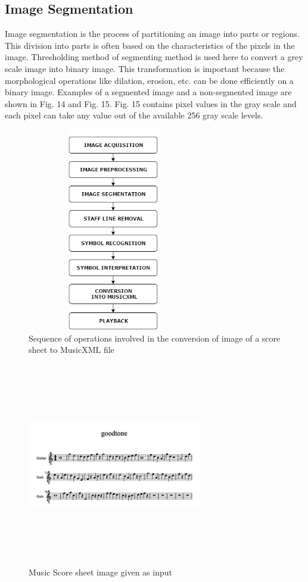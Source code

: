 \documentclass[journal]{IEEEtran}
\begin{document}
\subsection{Image Segmentation}
Image segmentation is the process of partitioning an image into parts or regions. This division into parts is often based on the characteristics of the pixels in the image. Thresholding method of segmenting method is used here to convert a grey scale image into binary image. This transformation is important because the morphological operations like dilation, erosion, etc. can be done efficiently on a binary image. Examples of a segmented image and a non-segmented image are shown in Fig. 14 and Fig. 15. Fig. 15 contains pixel values in the gray scale and each pixel can take any value out of the available 256 gray scale levels.

\begin{figure}
\includegraphics[width=3in,height=3.5in,clip,keepaspectratio]{resources/flowchart/flowchart}
\centering
\caption{Sequence of operations involved in the conversion of image of a score sheet to MusicXML file}
\end{figure}

\begin{figure}
\includegraphics[width=3in,height=3.5in,clip,keepaspectratio]{resources/implementation/good_tone}
\centering
\caption{Music Score sheet image given as input}
\end{figure}
\end{document}
